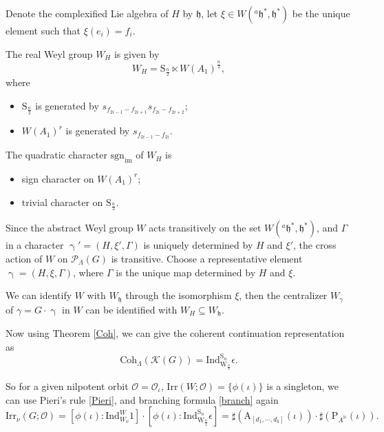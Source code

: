 \documentclass[12pt, a4paper]{amsart}
\numberwithin{equation}{section}
\newcommand{\BH}{{\mathbb {H}}}
\newcommand{\CK}{{\mathcal {K}}}
\newcommand{\CO}{{\mathcal {O}}}
\newcommand{\CP}{{\mathcal {P}}}
\newcommand{\fh}{\mathfrak{h}}
\newcommand{\A}{{\mathrm{A}}}
\newcommand{\Ind}{{\mathrm{Ind}}}
\newcommand{\Irr}{{\mathrm{Irr}}}
\newcommand{\sgn}{{\mathrm{sgn}}}
\begin{document}
Denote the complexified Lie algebra of $H$ by $\fh$, let $\xi \in W({^{a}\fh^*},\fh^*)$ be the unique element such that $\xi(e_i) = f_i$.

The real Weyl group $W_{H}$ is given by
$$W_{H} = \mathrm{S}_{\frac{n}{2}} \ltimes W(A_1)^{\frac{n}{2}},$$
where 
\begin{itemize}
    \item $\mathrm{S}_{\frac{n}{2}}$ is generated by $s_{f_{2i-1}-f_{2i+1}}s_{f_{2i}-f_{2i+2}}$;
    \item $W(A_1)^r$ is generated by $s_{f_{2i-1}-f_{2i}}$.
\end{itemize}



The quadratic character $\sgn_{\mathrm{im}}$ of $W_{H}$ is 
\begin{itemize}
    \item sign character on $W(A_1)^r$;
    \item trivial character on $\mathrm{S}_{\frac{n}{2}}$.
\end{itemize}

Since the abstract Weyl group $W$ acts transitively on the set $W({^{a}\fh}^*,\fh^*)$, and $\Gamma$ in a character $\upgamma' = (H,\xi',\Gamma)$ is uniquely determined by $H$ and $\xi'$, the cross action of $W$ on $\CP_{\Lambda}(G)$ is transitive.  Choose a representative element $\upgamma = (H,\xi,\Gamma)$, where $\Gamma$ is the unique map determined by $H$ and $\xi$.

We can identify $W$ with $W_{\fh}$ through the isomorphism $\xi$, then the centralizer $W_{{\gamma}}$ of $\gamma = G \cdot \upgamma$ in $W$ can be identified with $W_{H} \subseteq W_{\fh}$.

Now using Theorem \ref{Coh}, we can give the coherent continuation representation as 
\begin{equation}
    \mathrm{Coh}_{\Lambda}(\CK(G)) = \Ind_{\mathrm{W}_{\frac{n}{2}}}^{\mathrm{S}_n} \epsilon.
\end{equation}

So for a given nilpotent orbit $\CO = \CO_{\iota}$, $\Irr(W;\CO) = \{\phi(\iota)\}$ is a singleton, we can use Pieri's rule \ref{Pieri}, and branching formula \ref{branch} again
\begin{equation}
    \Irr_{\nu}(G;\CO) = [\phi(\iota):\Ind_{W_\nu}^{W}1]\cdot[\phi(\iota): \Ind_{\mathrm{W}_{\frac{n}{2}}}^{\mathrm{S}_n}\epsilon] = \sharp(\A_{[d_1,\cdots,d_k]}(\iota))\cdot \sharp(\mathrm{P}_{A^\BH}(\iota)).
\end{equation}
\end{document}
